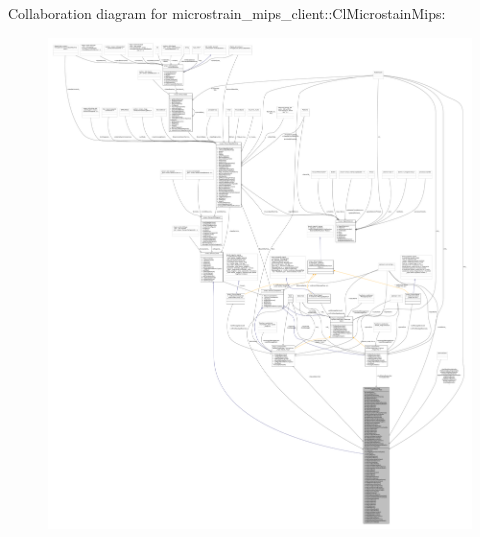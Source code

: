 Collaboration diagram for microstrain\+\_\+mips\+\_\+client\+:\+:Cl\+Microstain\+Mips\+:
\nopagebreak
\begin{figure}[H]
\begin{center}
\leavevmode
\includegraphics[width=350pt]{classmicrostrain__mips__client_1_1ClMicrostainMips__coll__graph}
\end{center}
\end{figure}
